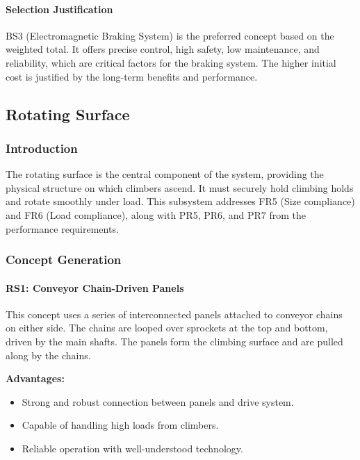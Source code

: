 \paragraph{Selection Justification}

BS3 (Electromagnetic Braking System) is the preferred concept based on the weighted total. It offers precise control, high safety, low maintenance, and reliability, which are critical factors for the braking system. The higher initial cost is justified by the long-term benefits and performance.

\subsection{Rotating Surface}

\subsubsection{Introduction}

The rotating surface is the central component of the system, providing the physical structure on which climbers ascend. It must securely hold climbing holds and rotate smoothly under load. This subsystem addresses FR5 (Size compliance) and FR6 (Load compliance), along with PR5, PR6, and PR7 from the performance requirements.

\subsubsection{Concept Generation}

\paragraph{RS1: Conveyor Chain-Driven Panels}

This concept uses a series of interconnected panels attached to conveyor chains on either side. The chains are looped over sprockets at the top and bottom, driven by the main shafts. The panels form the climbing surface and are pulled along by the chains.


\textbf{Advantages:}
\begin{itemize}
    \item Strong and robust connection between panels and drive system.
    \item Capable of handling high loads from climbers.
    \item Reliable operation with well-understood technology.
\end{itemize}

